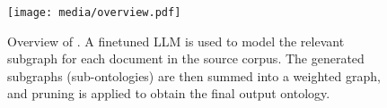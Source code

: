 \begin{figure}
    \centering
    \texttt{[image: media/overview.pdf]}
    \caption{Overview of \name. A finetuned LLM is used to model the relevant subgraph for each document in the source corpus. The generated subgraphs (sub-ontologies) are then summed into a weighted graph, and pruning is applied to obtain the final output ontology.}
    \label{fig:overview}
\end{figure}